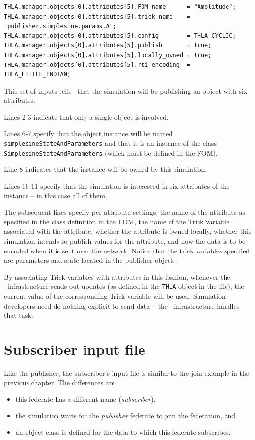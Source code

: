 \begin{lstlisting}[caption={{\tt SIM\_simplesine\_hla\_pub} input file},label={list:hla-pub-input}]
THLA.manager.objects[0].attributes[5].FOM_name      = "Amplitude";
THLA.manager.objects[0].attributes[5].trick_name    = "publisher.simplesine.params.A";
THLA.manager.objects[0].attributes[5].config        = THLA_CYCLIC;
THLA.manager.objects[0].attributes[5].publish       = true;
THLA.manager.objects[0].attributes[5].locally_owned = true;
THLA.manager.objects[0].attributes[5].rti_encoding  = THLA_LITTLE_ENDIAN;
\end{lstlisting}

This set of inputs tells \TrickHLA\ that the simulation will be publishing
an object with six attributes.

Lines 2-3 indicate that only a single object is involved.

Lines 6-7 specify that the object instance will be named
{\tt simplesineStateAndParameters} and that it is an instance of the class
{\tt SimplesineStateAndParameters} (which must be defined in the FOM).

Line 8 indicates that the instance will be owned by this simulation.

Lines 10-11 specify that the simulation is interested in six attributes
of the instance -- in this case all of them.

The subsequent lines specify per-attribute settings:
the name of the attribute as specified in the class definition in the FOM,
the name of the Trick variable associated with the attribute,
whether the attribute is owned locally,
whether this simulation intends to publish values for the attribute,
and how the data is to be encoded when it is sent over the network.
Notice that the trick variables specified are {\simplesine} parameters
and state located in the publisher object.

By associating Trick variables with attributes in this fashion,
whenever the \TrickHLA\ infrastructure sends out updates
(as defined in the {\tt THLA} object in the \sdefine file),
the current value of the corresponding Trick variable will be used.
Simulation developers need do nothing explicit to send data --
the \TrickHLA\ infrastructure handles that task.

\section{Subscriber input file}

Like the publisher, the subscriber's input file is similar to the join example
in the previous chapter.
The differences are
\begin{itemize}
\item{
  this federate has a different name ({\em subscriber}).
}
\item{
  the simulation waits for the {\em publisher} federate to join
  the federation, and
}
\item{
  an object class is defined for the data to which this federate
  subscribes.
}
\end{itemize}

